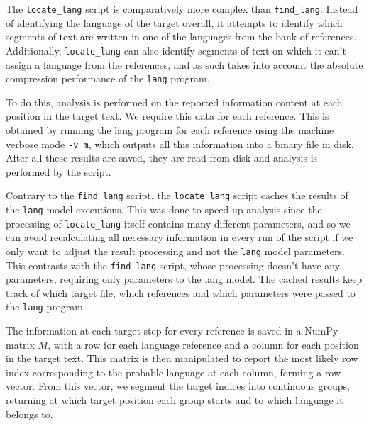\documentclass{article}
\begin{document}
The \texttt{locate_lang} script is comparatively more complex than \texttt{find_lang}.
Instead of identifying the language of the target overall, it attempts to identify which segments of text are written in one of the languages from the bank of references.
Additionally, \texttt{locate_lang} can also identify segments of text on which it can't assign a language from the references, and as such takes into account the absolute compression performance of the \texttt{lang} program.

To do this, analysis is performed on the reported information content at each position in the target text.
We require this data for each reference.
This is obtained by running the lang program for each reference using the machine verbose mode \texttt{-v m}, which outputs all this information into a binary file in disk.
After all these results are saved, they are read from disk and analysis is performed by the script.

Contrary to the \texttt{find_lang} script, the \texttt{locate_lang} script caches the results of the \texttt{lang} model executions.
This was done to speed up analysis since the processing of \texttt{locate_lang} itself contains many different parameters, and so we can avoid recalculating all necessary information in every run of the script if we only want to adjust the result processing and not the \texttt{lang} model parameters.
This contrasts with the \texttt{find_lang} script, whose processing doesn't have any parameters, requiring only parameters to the lang model.
The cached results keep track of which target file, which references and which parameters were passed to the \texttt{lang} program.

The information at each target step for every reference is saved in a NumPy matrix $M$, with a row for each language reference and a column for each position in the target text.
This matrix is then manipulated to report the most likely row index corresponding to the probable language at each column, forming a row vector.
From this vector, we segment the target indices into continuous groups, returning at which target position each group starts and to which language it belongs to.
\end{document}
